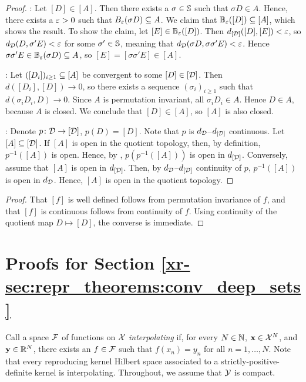 \documentclass[12pt, twoside]{report}
\newcommand{\xrprefix}[1]{xr-#1}
\begin{document}
\begin{proof}
    :
    Let $[D] \in [A]$.
    Then there exists a $\sigma \in \mathbb{S}$ such that $\sigma D \in A$.
    Hence, there exists a $\varepsilon > 0$ such that $B_\varepsilon(\sigma D) \subseteq A$.
    We claim that $\mathbb{B}_\varepsilon([D]) \subseteq [A]$, which shows the result.
    To show the claim, let $[E] \in \mathbb{B}_\varepsilon([D])$.
    Then $d_{[\mathcal{D}]}([D], [E]) < \varepsilon$, so $d_{\mathcal{D}}(D, \sigma' E) < \varepsilon$ for some $\sigma' \in \mathbb{S}$,
    meaning that $d_{\mathcal{D}}(\sigma D, \sigma \sigma' E) < \varepsilon$.
    Hence $\sigma \sigma' E \in \mathbb{B}_\varepsilon(\sigma D) \subseteq A$, so $[E] = [\sigma \sigma' E] \in [A]$.

    :
    Let $([D_i])_{i \ge 1} \subseteq [A]$ be convergent to some $[D] \in [\mathcal{D}]$.
    Then $d([D_i], [D]) \to 0$,
    so there exists a sequence $(\sigma_i)_{i \ge 1}$ such that $d(\sigma_i D_i, D) \to 0$.
    Since $A$ is permutation invariant, all $\sigma_i D_i \in A$.
    Hence $D \in A$, because $A$ is closed.
    We conclude that $[D] \in [A]$, so $[A]$ is also closed.
    
    :
    Denote $p\colon \mathcal{D} \to [\mathcal{D}]$, $p(D) = [D]$.
    Note that $p$ is $d_{\mathcal{D}}$--$d_{[\mathcal{D}]}$ continuous.
    Let $[A] \subseteq [\mathcal{D}]$.
    If $[A]$ is open in the quotient topology, then, by definition, $p^{-1}([A])$ is open.
    Hence, by , $p(p^{-1}([A]))$ is open in $d_{[\mathcal{D}]}$.
    Conversely, assume that $[A]$ is open in $d_{[\mathcal{D}]}$.
    Then, by $d_{\mathcal{D}}$--$d_{[\mathcal{D}]}$ continuity of $p$, $p^{-1}([A])$ is open in $d_{\mathcal{D}}$.
    Hence, $[A]$ is open in the quotient topology.
\end{proof}

\begin{proof}
    That $[f]$ is well defined follows from permutation invariance of $f$,
    and that $[f]$ is continuous follows from continuity of $f$.
    Using continuity of the quotient map $D \mapsto [D]$, the converse is immediate.
\end{proof}

\section{Proofs for Section \ref{\xrprefix{sec:repr_theorems:conv_deep_sets}}}
\label{sec:proofs_repr_theorems:conv_deep_sets}

Call a space $\mathcal{F}$ of functions on $\mathcal{X}$ \emph{interpolating} if, for every $N \in \mathbb{N}$, $\mathbf{x} \in \mathcal{X}^N$, and $\mathbf{y} \in \mathbb{R}^N$, there exists an $f \in \mathcal{F}$ such that $f(x_n) = y_n$ for all $n = 1, \ldots, N$.
Note that every reproducing kernel Hilbert space associated to a strictly-positive-definite kernel is interpolating.
Throughout, we assume that $\mathcal{Y}$ is compact.
\end{document}
